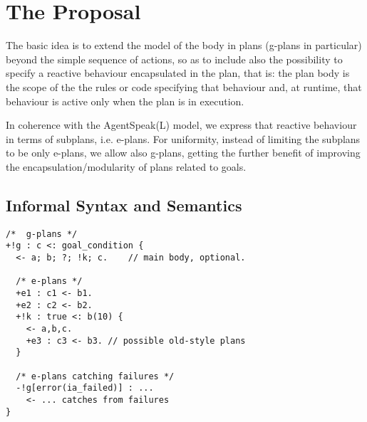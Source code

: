 \section{The {\aser} Proposal}
\label{sec:proposal}

The basic idea is to extend the model of the body in plans (g-plans in particular) beyond the simple sequence of actions, so as to include also the possibility to specify a reactive behaviour encapsulated in the plan, that is: the plan body is the scope of the the rules or code specifying that behaviour and, at runtime, that behaviour is active only when the plan is in execution.

In coherence with the AgentSpeak(L) model, we express that reactive behaviour in terms of subplans, i.e. e-plans.  
%
For uniformity, instead of limiting the subplans to be only e-plans, we allow also g-plans, getting the further benefit of improving the encapsulation/modularity of plans related to goals.

\subsection{Informal Syntax and Semantics}

%
%
{\small
\begin{verbatim}
/*  g-plans */
+!g : c <: goal_condition { 
  <- a; b; ?; !k; c. 	// main body, optional.

  /* e-plans */
  +e1 : c1 <- b1.	
  +e2 : c2 <- b2.
  +!k : true <: b(10) {
    <- a,b,c.
    +e3 : c3 <- b3. // possible old-style plans
  }	
  
  /* e-plans catching failures */
  -!g[error(ia_failed)] : ...
    <- ... catches from failures 
}
\end{verbatim}}

